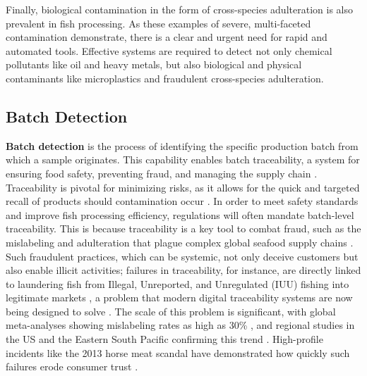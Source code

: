 Finally, biological contamination in the form of cross-species adulteration \citep{Premanandh2013} is also prevalent in fish processing. As these examples of severe, multi-faceted contamination demonstrate, there is a clear and urgent need for rapid and automated tools. Effective systems are required to detect not only chemical pollutants like oil and heavy metals, but also biological and physical contaminants like microplastics and fraudulent cross-species adulteration.

\subsection{Batch Detection}

\textbf{Batch detection} is the process of identifying the specific production batch from which a sample originates. This capability enables batch traceability, a system for ensuring food safety, preventing fraud, and managing the supply chain \citep{Lu2024, Xue2025}. Traceability is pivotal for minimizing risks, as it allows for the quick and targeted recall of products should contamination occur \citep{Mai2010}. In order to meet safety standards and improve fish processing efficiency, regulations will often mandate batch-level traceability. This is because traceability is a key tool to combat fraud, such as the mislabeling and adulteration that plague complex global seafood supply chains \citep{Do2025, Walsh2025}. Such fraudulent practices, which can be systemic, not only deceive customers but also enable illicit activities; failures in traceability, for instance, are directly linked to laundering fish from Illegal, Unreported, and Unregulated (IUU) fishing into legitimate markets \citep{Helyar2014}, a problem that modern digital traceability systems are now being designed to solve \citep{turkson2025digital}. The scale of this problem is significant, with global meta-analyses showing mislabeling rates as high as 30\% \citep{Pardo2016}, and regional studies in the US and the Eastern South Pacific confirming this trend \citep{Ahles2025, Marin2025}. High-profile incidents like the 2013 horse meat scandal have demonstrated how quickly such failures erode consumer trust \citep{Premanandh2013}.

